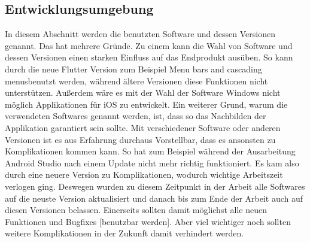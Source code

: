 \subsection{Entwicklungsumgebung}
In diesem Abschnitt werden die benutzten Software und dessen Versionen genannt.
Das hat mehrere Gründe. Zu einem kann die Wahl von Software und dessen Versionen einen starken Einfluss auf das Endprodukt ausüben. So kann durch die neue Flutter Version zum Beispiel \glqq Menu bars and cascading menus\grqq benutzt werden, während ältere Versionen diese Funktionen nicht unterstützen\cite{tech_flutterUpdate}. Außerdem wäre es mit der Wahl der Software Windows nicht möglich Applikationen für iOS zu entwickelt. 
	Ein weiterer Grund, warum die verwendeten Softwares genannt werden, ist, dass so das Nachbilden der Applikation garantiert sein sollte. Mit verschiedener Software oder anderen Versionen ist es aus Erfahrung durchaus Vorstellbar, dass es ansonsten zu Komplikationen kommen kann. So hat zum Beispiel während der Ausarbeitung Android Studio nach einem Update nicht mehr richtig funktioniert. Es kam also durch eine neuere Version zu Komplikationen, wodurch wichtige Arbeitszeit verlogen ging.
		Deswegen wurden zu diesem Zeitpunkt in der Arbeit alle Softwares auf die neuste Version aktualisiert und danach bis zum Ende der Arbeit auch auf diesen Versionen belassen. Einerseits sollten damit möglichst alle neuen Funktionen und Bugfixes [benutzbar werden]. Aber viel wichtiger noch sollten weitere Komplikationen in der Zukunft damit verhindert werden.
		\newline

